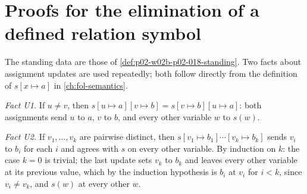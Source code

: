 \section{Proofs for the elimination of a defined relation symbol}
\label{sec:annex-p02-w02b-p02-018-defined-relation-elimination}

The standing data are those of \cref{def:p02-w02b-p02-018-standing}.  Two
facts about assignment updates are used repeatedly; both follow directly
from the definition of \(s[x\mapsto a]\) in \cref{ch:fol-semantics}.

\emph{Fact U1.}  If \(u\ne v\), then
\(s[u\mapsto a][v\mapsto b]=s[v\mapsto b][u\mapsto a]\): both assignments
send \(u\) to \(a\), \(v\) to \(b\), and every other variable \(w\) to
\(s(w)\).

\emph{Fact U2.}  If \(v_1,\ldots,v_k\) are pairwise distinct, then
\(s[v_1\mapsto b_1]\cdots[v_k\mapsto b_k]\) sends \(v_i\) to \(b_i\) for
each \(i\) and agrees with \(s\) on every other variable.  By induction on
\(k\): the case \(k=0\) is trivial; the last update sets \(v_k\) to
\(b_k\) and leaves every other variable at its previous value, which by
the induction hypothesis is \(b_i\) at \(v_i\) for \(i<k\), since
\(v_i\ne v_k\), and \(s(w)\) at every other \(w\).

